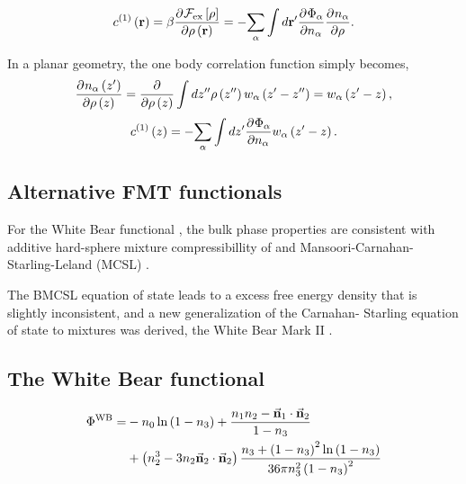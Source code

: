 \documentclass[12pt, letterpaper]{article}
\newcommand*{\pd}[3][]{\frac{\partial^{#1}#2}{\partial{#3}^{#1}}}%
\newcommand*{\vc}[1]{\vec{\mathbf{#1}}}%
\newcommand*{\lb}{\ensuremath{\left(}}
\newcommand*{\rb}{\ensuremath{\right)}}
\newcommand*{\lbf}{\ensuremath{\left[}}
\newcommand*{\rbf}{\ensuremath{\right]}}
\newcommand{\WB}{\ensuremath{\text{WB}}\xspace}
\newcommand{\excess}{\ensuremath{\text{ex}}\xspace}
\begin{document}
\begin{equation}
  c^{(1)}\lb \mathbf{r} \rb = \beta \pd{\mathcal{F}_{\excess} \lbf \rho \rbf}{\rho \lb \mathbf{r} \rb} =  -\underset{\alpha}{\sum} \int d \mathbf{r}^\prime \pd{\Phi_\alpha}{n_\alpha} \pd{n_\alpha}{\rho}.
\end{equation}

In a planar geometry, the one body correlation function simply becomes,
\begin{equation}
  \label{eq:dndrho}
  \pd{n_\alpha \lb z^\prime \rb}{\rho \lb z \rb} = \frac{\partial}{\partial \rho \lb z \rb} \int dz^{\prime\prime} \rho \lb z^{\prime\prime} \rb w_\alpha \lb z^\prime - z^{\prime\prime} \rb = w_\alpha \lb z^\prime - z\rb,
\end{equation}
\begin{equation}
  \label{eq:c1_1d}
  c^{(1)}\lb z \rb = -\underset{\alpha}{\sum} \int d z^\prime \pd{\Phi_\alpha}{n_\alpha} w_\alpha \lb z^\prime - z\rb.
\end{equation}

\subsection{Alternative FMT functionals}
For the White Bear functional \cite{roth2002}, the bulk phase
properties are consistent with additive hard-sphere mixture
compressibillity of \citet{boublik1970} and
Mansoori-Carnahan-Starling-Leland (MCSL) \cite{mansoori1971}.

The BMCSL equation of state leads to a excess free energy density that
is slightly inconsistent, and a new generalization of the Carnahan-
Starling \cite{carnahan1969} equation of state to mixtures was derived,
the White Bear Mark II \cite{hansen-goos2006a}.

\subsection{The White Bear functional}

\begin{align}
  \Phi^\WB =& -n_0 \ln \lb 1 - n_3 \rb +
              \frac{n_1 n_2 - \vc{n}_1 \cdot \vc{n}_2}{1 - n_3}\nonumber \\
  &+ \lb n_2^3 - 3 n_2 \vc{n}_2 \cdot \vc{n}_2 \rb \frac{ n_3 + \lb 1 - n_3 \rb ^2 \ln \lb 1 - n_3 \rb}{36\pi n_3^2 \lb 1 - n_3 \rb^2}
\end{align}
\end{document}

